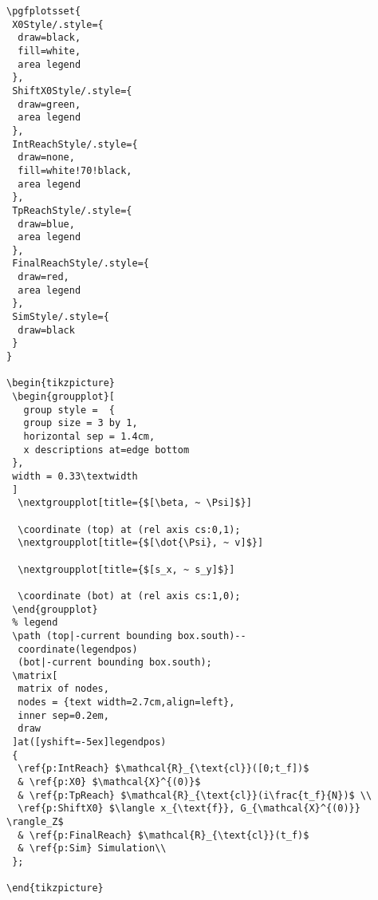 \begin{verbatim}
\pgfplotsset{
 X0Style/.style={
  draw=black, 
  fill=white,
  area legend
 },
 ShiftX0Style/.style={
  draw=green,
  area legend
 },
 IntReachStyle/.style={
  draw=none, 
  fill=white!70!black,
  area legend
 },
 TpReachStyle/.style={
  draw=blue,
  area legend
 },
 FinalReachStyle/.style={
  draw=red,
  area legend
 },
 SimStyle/.style={
  draw=black
 }
}

\begin{tikzpicture}
 \begin{groupplot}[
   group style =  {
   group size = 3 by 1,
   horizontal sep = 1.4cm,
   x descriptions at=edge bottom
 },
 width = 0.33\textwidth
 ]
  \nextgroupplot[title={$[\beta, ~ \Psi]$}]
  
  \coordinate (top) at (rel axis cs:0,1);
  \nextgroupplot[title={$[\dot{\Psi}, ~ v]$}]
  
  \nextgroupplot[title={$[s_x, ~ s_y]$}]
  
  \coordinate (bot) at (rel axis cs:1,0);
 \end{groupplot}
 % legend
 \path (top|-current bounding box.south)--
  coordinate(legendpos)
  (bot|-current bounding box.south);
 \matrix[
  matrix of nodes,
  nodes = {text width=2.7cm,align=left},
  inner sep=0.2em,
  draw
 ]at([yshift=-5ex]legendpos)
 {
  \ref{p:IntReach} $\mathcal{R}_{\text{cl}}([0;t_f])$
  & \ref{p:X0} $\mathcal{X}^{(0)}$
  & \ref{p:TpReach} $\mathcal{R}_{\text{cl}}(i\frac{t_f}{N})$ \\
  \ref{p:ShiftX0} $\langle x_{\text{f}}, G_{\mathcal{X}^{(0)}} \rangle_Z$
  & \ref{p:FinalReach} $\mathcal{R}_{\text{cl}}(t_f)$
  & \ref{p:Sim} Simulation\\
 };

\end{tikzpicture}
\end{verbatim}